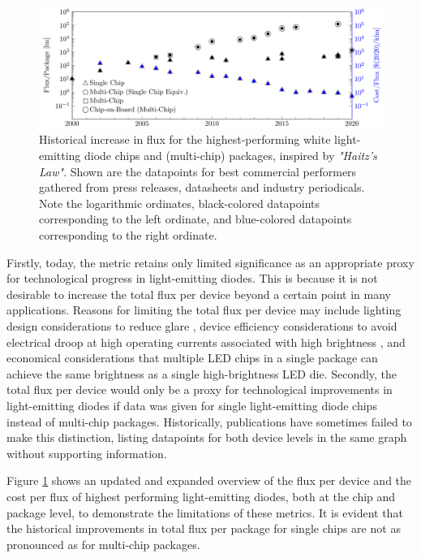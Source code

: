 \documentclass[a4paper,nocompress]{spie}  %
\begin{document}
    \begin{figure} [ht]
        \begin{center}
            \includegraphics[width=\textwidth]{haitz_law_white.pdf}
        \end{center}
        \caption{Historical increase in flux for the highest-performing white light-emitting diode chips and (multi-chip) packages, inspired by \textit{"Haitz's Law"}\cite{haitz1999case}. Shown are the datapoints for best commercial performers gathered from press releases, datasheets and industry periodicals. Note the logarithmic ordinates, black-colored datapoints corresponding to the left ordinate, and blue-colored datapoints corresponding to the right ordinate.}
        \label{fig:haitz}
    \end{figure}
    
    Firstly, today, the metric retains only limited significance as an appropriate proxy for technological progress in light-emitting diodes. This is because it is not desirable to increase the total flux per device beyond a certain point in many applications. Reasons for limiting the total flux per device may include lighting design considerations to reduce glare \cite{khan2015led}, device efficiency considerations to avoid electrical droop at high operating currents associated with high brightness \cite{Piprek2010}, and economical considerations that multiple LED chips in a single package can achieve the same brightness as a single high-brightness LED die. Secondly, the total flux per device would only be a proxy for technological improvements in light-emitting diodes if data was given for single light-emitting diode chips instead of multi-chip packages. Historically, publications have sometimes failed to make this distinction, listing datapoints for both device levels in the same graph without supporting information.

    Figure \ref{fig:haitz} shows an updated and expanded overview of the flux per device and the cost per flux of highest performing light-emitting diodes, both at the chip and package level, to demonstrate the limitations of these metrics. It is evident that the historical improvements in total flux per package for single chips are not as pronounced as for multi-chip packages.
\end{document}
